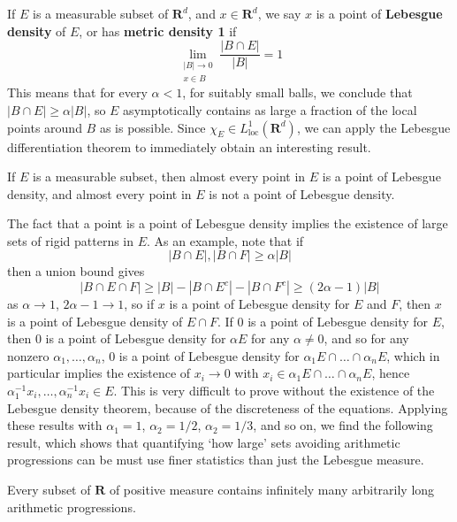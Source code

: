 If $E$ is a measurable subset of $\mathbf{R}^d$, and $x \in \mathbf{R}^d$, we say $x$ is a point of {\bf Lebesgue density} of $E$, or has {\bf metric density 1} if
%
\[ \lim_{\substack{|B| \to 0\\x \in B}} \frac{|B \cap E|}{|B|} = 1 \]
%
This means that for every $\alpha < 1$, for suitably small balls, we conclude that $|B \cap E| \geq \alpha |B|$, so $E$ asymptotically contains as large a fraction of the local points around $B$ as is possible. Since $\chi_E \in L^1_{\text{loc}}(\mathbf{R}^d)$, we can apply the Lebesgue differentiation theorem to immediately obtain an interesting result.

\begin{theorem}
    If $E$ is a measurable subset, then almost every point in $E$ is a point of Lebesgue density, and almost every point in $E$ is not a point of Lebesgue density.
\end{theorem}

The fact that a point is a point of Lebesgue density implies the existence of large sets of rigid patterns in $E$. As an example, note that if
%
\[ |B \cap E|, |B \cap F| \geq \alpha |B| \]
%
then a union bound gives
%
\[ |B \cap E \cap F| \geq |B| - |B \cap E^c| - |B \cap F^c| \geq (2 \alpha - 1) |B| \]
%
as $\alpha \to 1$, $2\alpha - 1 \to 1$, so if $x$ is a point of Lebesgue density for $E$ and $F$, then $x$ is a point of Lebesgue density of $E \cap F$. If $0$ is a point of Lebesgue density for $E$, then $0$ is a point of Lebesgue density for $\alpha E$ for any $\alpha \neq 0$, and so for any nonzero $\alpha_1, \dots, \alpha_n$, $0$ is a point of Lebesgue density for $\alpha_1 E \cap \dots \cap \alpha_n E$, which in particular implies the existence of $x_i \to 0$ with $x_i \in \alpha_1 E \cap \dots \cap \alpha_n E$, hence $\alpha_1^{-1} x_i, \dots, \alpha_n^{-1} x_i \in E$. This is very difficult to prove without the existence of the Lebesgue density theorem, because of the discreteness of the equations. Applying these results with $\alpha_1 = 1$, $\alpha_2 = 1/2$, $\alpha_2 = 1/3$, and so on, we find the following result, which shows that quantifying `how large' sets avoiding arithmetic progressions can be must use finer statistics than just the Lebesgue measure.

\begin{theorem}
    Every subset of $\mathbf{R}$ of positive measure contains infinitely many arbitrarily long arithmetic progressions.
\end{theorem}


